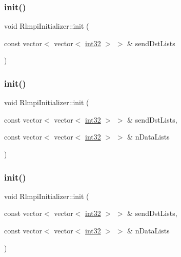 \subsubsection{\texorpdfstring{init()}{init()}\hspace{0.1cm}{\footnotesize\ttfamily [2/4]}}
{\footnotesize\ttfamily void Rlmpi\+Initializer\+::init (\begin{DoxyParamCaption}\item[{const vector$<$ vector$<$ \mbox{\hyperlink{include_2RlmpiShared_8h_a56f1a81c92849566ae864511088eb7e8}{int32}} $>$ $>$ \&}]{send\+Dst\+Lists }\end{DoxyParamCaption})}

\mbox{\label{classRlmpiInitializer_ad23febf3d25fd76c52e2488d00b0ba09}} 
\subsubsection{\texorpdfstring{init()}{init()}\hspace{0.1cm}{\footnotesize\ttfamily [3/4]}}
{\footnotesize\ttfamily void Rlmpi\+Initializer\+::init (\begin{DoxyParamCaption}\item[{const vector$<$ vector$<$ \mbox{\hyperlink{include_2RlmpiShared_8h_a56f1a81c92849566ae864511088eb7e8}{int32}} $>$ $>$ \&}]{send\+Dst\+Lists,  }\item[{const vector$<$ vector$<$ \mbox{\hyperlink{include_2RlmpiShared_8h_a56f1a81c92849566ae864511088eb7e8}{int32}} $>$ $>$ \&}]{n\+Data\+Lists }\end{DoxyParamCaption})}

\mbox{\label{classRlmpiInitializer_ad23febf3d25fd76c52e2488d00b0ba09}} 
\subsubsection{\texorpdfstring{init()}{init()}\hspace{0.1cm}{\footnotesize\ttfamily [4/4]}}
{\footnotesize\ttfamily void Rlmpi\+Initializer\+::init (\begin{DoxyParamCaption}\item[{const vector$<$ vector$<$ \mbox{\hyperlink{include_2RlmpiShared_8h_a56f1a81c92849566ae864511088eb7e8}{int32}} $>$ $>$ \&}]{send\+Dst\+Lists,  }\item[{const vector$<$ vector$<$ \mbox{\hyperlink{include_2RlmpiShared_8h_a56f1a81c92849566ae864511088eb7e8}{int32}} $>$ $>$ \&}]{n\+Data\+Lists }\end{DoxyParamCaption})}

